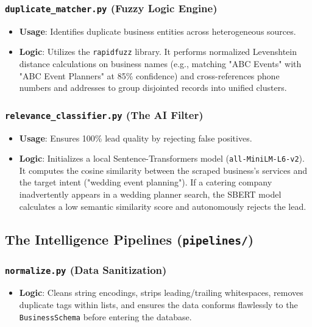 \documentclass[12pt,a4paper]{article}
\begin{document}
\subsubsection{\texttt{duplicate\_matcher.py} (Fuzzy Logic Engine)}
\begin{itemize}
    \item \textbf{Usage}: Identifies duplicate business entities across heterogeneous sources.
    \item \textbf{Logic}: Utilizes the \texttt{rapidfuzz} library. It performs normalized Levenshtein distance calculations on business names (e.g., matching "ABC Events" with "ABC Event Planners" at 85\% confidence) and cross-references phone numbers and addresses to group disjointed records into unified clusters.
\end{itemize}

\subsubsection{\texttt{relevance\_classifier.py} (The AI Filter)}
\begin{itemize}
    \item \textbf{Usage}: Ensures 100\% lead quality by rejecting false positives.
    \item \textbf{Logic}: Initializes a local Sentence-Transformers model (\texttt{all-MiniLM-L6-v2}). It computes the cosine similarity between the scraped business's services and the target intent ("wedding event planning"). If a catering company inadvertently appears in a wedding planner search, the SBERT model calculates a low semantic similarity score and autonomously rejects the lead.
\end{itemize}

\subsection{The Intelligence Pipelines (\texttt{pipelines/})}

\subsubsection{\texttt{normalize.py} (Data Sanitization)}
\begin{itemize}
    \item \textbf{Logic}: Cleans string encodings, strips leading/trailing whitespaces, removes duplicate tags within lists, and ensures the data conforms flawlessly to the \texttt{BusinessSchema} before entering the database.
\end{itemize}
\end{document}
